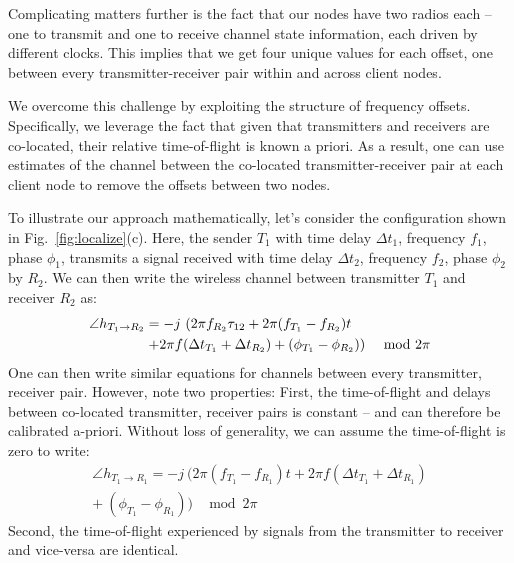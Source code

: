 Complicating matters further is the fact that our nodes have two radios each -- one to transmit and one to receive channel state information, each driven by different clocks. This implies that we get four unique values for each offset, one between every transmitter-receiver pair within and across client nodes.

We overcome this challenge by exploiting the structure of  frequency offsets. Specifically, we leverage the fact that given that transmitters and receivers are co-located, their relative time-of-flight is known a priori. As a result, one can use estimates of the channel between the co-located transmitter-receiver pair at each client node to remove the offsets between two nodes. 

To illustrate our approach mathematically, let's consider the configuration shown in Fig.~\ref{fig:localize}(c).  Here, the sender $T_1$ with time delay $\Delta t_1$, frequency $f_1$, phase $\phi_1$, transmits a signal received with time delay $\Delta t_2$, frequency $f_2$, phase $\phi_2$ by $R_2$. We can then write the wireless channel between transmitter $T_1$ and receiver $R_2$ as:
\begin{align}
\angle h_{T_1 \rightarrow R_2} = -j~(2 \pi f_{R_2} \tau_{12} + 2 \pi (f_{T_1} - f_{R_2}) t\hspace*{2cm} \nonumber \\
+ 2 \pi f (\Delta t_{T_1} + \Delta t_{R_2}) +(\phi_{T_1} - \phi_{R_2}) ) ~~\mod 2\pi \label{eqn:h1}
\end{align}
One can then write similar equations for channels between every transmitter, receiver pair. However,  note two properties: First, the time-of-flight and delays between co-located transmitter, receiver pairs is constant -- and can therefore be calibrated a-priori. Without loss of generality, we can assume the time-of-flight is zero to write:
\begin{align}
\angle h_{T_1 \rightarrow R_1} = -j~(2 \pi (f_{T_1} - f_{R_1}) t + 2 \pi f (\Delta t_{T_1} + \Delta t_{R_1})  \nonumber \\
+~(\phi_{T_1} - \phi_{R_1}) ) ~~\mod 2\pi \label{eqn:h22}
\end{align}
Second, the time-of-flight experienced by signals from the transmitter to receiver and vice-versa are identical. 
